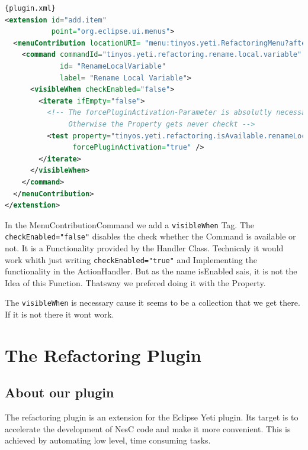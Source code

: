 \documentclass[a4paper,10pt]{report}
\begin{document}
\begin{lstlisting}[language=XML,caption=Visibility Condition ({\it plugin.xml})]{plugin.xml}
<extension id="add.item"
           point="org.eclipse.ui.menus">
  <menuContribution locationURI= "menu:tinyos.yeti.RefactoringMenu?after=additions">
    <command commandId="tinyos.yeti.refactoring.rename.local.variable"
             id= "RenameLocalVariable"
             label= "Rename Local Variable">
      <visibleWhen checkEnabled="false">
        <iterate ifEmpty="false">
          <!-- The forcePluginActivation-Parameter is absolutly necessary. 
               Otherwise the Property gets never checkt -->
          <test property="tinyos.yeti.refactoring.isAvailable.renameLocalVariable"
                forcePluginActivation="true" />
        </iterate>
      </visibleWhen>
    </command>
  </menuContribution>
</extenstion>
\end{lstlisting}
In the MenuContributionCommand we add a \verb!visibleWhen! Tag. The \verb!checkEnabled="false"! disables the check whether the Command is available or not. 
It is a Functionality provided by the Handler Class. Technicaly it would work whith just writing \verb!checkEnabled="true"! and Implementing the functionality in 
the ActionHandler. But as the name isEnabled sais, it is not the Idea of this Function. Thatsway we prefered doing it with the Property.

The \verb!visibleWhen! is necessary cause it seems to be a collection that we get there. If it is not there it wont work.

\part{The Refactoring Plugin}
\chapter{About our plugin}
The refactoring plugin is an extension for the Eclipse Yeti plugin. Its target is to accelerate the development of NesC code and make it more convenient.
This is achieved by automating low level, time consuming tasks.
\end{document}
